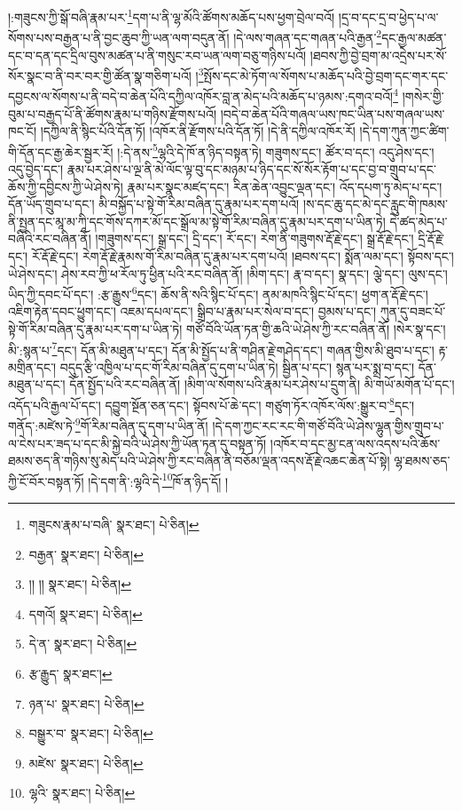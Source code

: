 །:གཟུངས་ཀྱི་སྒོ་བཞི་རྣམ་པར་\footnote{གཟུངས་རྣམ་པ་བཞི་  སྣར་ཐང་།  པེ་ཅིན། }དག་པ་ནི་ལྷ་མོའི་ཚོགས་མཆོད་པས་ཕྱག་བྲེལ་བའོ། །དྲ་བ་དང་དྲ་བ་ཕྱེད་པ་ལ་སོགས་པས་བརྒྱན་པ་ནི་བྱང་ཆུབ་ཀྱི་ཡན་ལག་བདུན་ནོ། །དེ་ལས་གཞན་དང་གཞན་པའི་རྒྱན་\footnote{བརྒྱན་  སྣར་ཐང་།  པེ་ཅིན། }དང་རྒྱལ་མཚན་དང་བ་དན་དང་དྲིལ་བུས་མཚན་པ་ནི་གསུང་རབ་ཡན་ལག་བཅུ་གཉིས་པའོ། །ཐབས་ཀྱི་བྱེ་བྲག་མ་འདྲེས་པར་སོ་སོར་སྣང་བ་ནི་བར་བར་གྱི་ཚོན་སྣ་གཅིག་པའོ། །\footnote{།། །།  སྣར་ཐང་།  པེ་ཅིན། }སྤོས་དང་མེ་ཏོག་ལ་སོགས་པ་མཆོད་པའི་བྱེ་བྲག་དང་གར་དང་དབྱངས་ལ་སོགས་པ་ནི་བདེ་བ་ཆེན་པོའི་དཀྱིལ་འཁོར་བླ་ན་མེད་པའི་མཆོད་པ་ཉམས་:དགའ་བའོ།\footnote{དགའོ།  སྣར་ཐང་།  པེ་ཅིན། } །གསེར་གྱི་བུམ་པ་བརྒྱད་པོ་ནི་ཚོགས་རྣམ་པ་གཉིས་རྫོགས་པའོ། །བདེ་བ་ཆེན་པོའི་གཞལ་ཡས་ཁང་ཡིན་པས་གཞལ་ཡས་ཁང་ངོ། །དཀྱིལ་ནི་སྙིང་པོའི་དོན་ཏོ། །འཁོར་ནི་རྫོགས་པའི་དོན་ཏོ། །དེ་ནི་དཀྱིལ་འཁོར་རོ། །དེ་དག་ཀུན་ཀྱང་ཚིག་གི་དོན་དང་རྒྱ་ཆེར་སྦྱར་རོ། །:དེ་ནས་\footnote{དེ་ན་  སྣར་ཐང་།  པེ་ཅིན། }ལྷའི་དེ་ཁོ་ན་ཉིད་བསྟན་ཏེ། གཟུགས་དང་། ཚོར་བ་དང་། འདུ་ཤེས་དང་། འདུ་བྱེད་དང་། རྣམ་པར་ཤེས་པ་ལྔ་ནི་མེ་ལོང་ལྟ་བུ་དང་མཉམ་པ་ཉིད་དང་སོ་སོར་རྟོག་པ་དང་བྱ་བ་གྲུབ་པ་དང་ཆོས་ཀྱི་དབྱིངས་ཀྱི་ཡེ་ཤེས་ཏེ། རྣམ་པར་སྣང་མཛད་དང་། རིན་ཆེན་འབྱུང་ལྡན་དང་། འོད་དཔག་ཏུ་མེད་པ་དང་། དོན་ཡོད་གྲུབ་པ་དང་། མི་བསྐྱོད་པ་སྟེ་གོ་རིམ་བཞིན་དུ་རྣམ་པར་དག་པའོ། །ས་དང་ཆུ་དང་མེ་དང་རླུང་གི་ཁམས་ནི་སྤྱན་དང་མཱ་མ་ཀཱི་དང་གོས་དཀར་མོ་དང་སྒྲོལ་མ་སྟེ་གོ་རིམ་བཞིན་དུ་རྣམ་པར་དག་པ་ཡིན་ཏེ། དེ་ཚད་མེད་པ་བཞིའི་རང་བཞིན་ནོ། །གཟུགས་དང་། སྒྲ་དང་། དྲི་དང་། རོ་དང་། རེག་ནི་གཟུགས་རྡོ་རྗེ་དང་། སྒྲ་རྡོ་རྗེ་དང་། དྲི་རྡོ་རྗེ་དང་། རོ་རྡོ་རྗེ་དང་། རེག་རྡོ་རྗེ་རྣམས་གོ་རིམ་བཞིན་དུ་རྣམ་པར་དག་པའོ། །ཐབས་དང་། སྨོན་ལམ་དང་། སྟོབས་དང་། ཡེ་ཤེས་དང་། ཤེས་རབ་ཀྱི་ཕ་རོལ་ཏུ་ཕྱིན་པའི་རང་བཞིན་ནོ། །མིག་དང་། རྣ་བ་དང་། སྣ་དང་། ལྕེ་དང་། ལུས་དང་། ཡིད་ཀྱི་དབང་པོ་དང་། :རྩ་རྒྱུས་\footnote{རྩ་རྒྱུད་  སྣར་ཐང་། }དང་། ཆོས་ནི་སའི་སྙིང་པོ་དང་། ནམ་མཁའི་སྙིང་པོ་དང་། ཕྱག་ན་རྡོ་རྗེ་དང་། འཇིག་རྟེན་དབང་ཕྱུག་དང་། འཇམ་དཔལ་དང་། སྒྲིབ་པ་རྣམ་པར་སེལ་བ་དང་། བྱམས་པ་དང་། ཀུན་དུ་བཟང་པོ་སྟེ་གོ་རིམ་བཞིན་དུ་རྣམ་པར་དག་པ་ཡིན་ཏེ། གཙོ་བོའི་ཡོན་ཏན་གྱི་ཆའི་ཡེ་ཤེས་ཀྱི་རང་བཞིན་ནོ། །སེར་སྣ་དང་། མི་:སྙན་པ་\footnote{ཉན་པ་  སྣར་ཐང་།  པེ་ཅིན། }དང་། དོན་མི་མཐུན་པ་དང་། དོན་མི་སྤྱོད་པ་ནི་གཤིན་རྗེ་གཤེད་དང་། གཞན་གྱིས་མི་ཐུབ་པ་དང་། རྟ་མགྲིན་དང་། བདུད་རྩི་འཁྱིལ་པ་དང་གོ་རིམ་བཞིན་དུ་དག་པ་ཡིན་ཏེ། སྦྱིན་པ་དང་། སྙན་པར་སྨྲ་བ་དང་། དོན་མཐུན་པ་དང་། དོན་སྤྱོད་པའི་རང་བཞིན་ནོ། །མིག་ལ་སོགས་པའི་རྣམ་པར་ཤེས་པ་དྲུག་ནི། མི་གཡོ་མགོན་པོ་དང་། འདོད་པའི་རྒྱལ་པོ་དང་། དབྱུག་སྔོན་ཅན་དང་། སྟོབས་པོ་ཆེ་དང་། གཙུག་ཏོར་འཁོར་ལོས་:སྒྱུར་བ་\footnote{བསྒྱུར་བ་  སྣར་ཐང་།  པེ་ཅིན། }དང་། གནོད་:མཛེས་ཏེ་\footnote{མཛེས་  སྣར་ཐང་།  པེ་ཅིན། }གོ་རིམ་བཞིན་དུ་དག་པ་ཡིན་ནོ། །དེ་དག་ཀྱང་རང་རང་གི་གཙོ་བོའི་ཡེ་ཤེས་ལྷུན་གྱིས་གྲུབ་པ་ལ་ངེས་པར་ཟད་པ་དང་མི་སྐྱེ་བའི་ཡེ་ཤེས་ཀྱི་ཡོན་ཏན་དུ་བསྟན་ཏོ། །འཁོར་བ་དང་མྱ་ངན་ལས་འདས་པའི་ཆོས་ཐམས་ཅད་ནི་གཉིས་སུ་མེད་པའི་ཡེ་ཤེས་ཀྱི་རང་བཞིན་ནི་བཅོམ་ལྡན་འདས་རྡོ་རྗེ་འཆང་ཆེན་པོ་སྟེ། ལྷ་ཐམས་ཅད་ཀྱི་ངོ་བོར་བསྟན་ཏོ། །དེ་དག་ནི་:ལྷའི་དེ་\footnote{ལྷའི་  སྣར་ཐང་།  པེ་ཅིན། }ཁོ་ན་ཉིད་དོ། །
